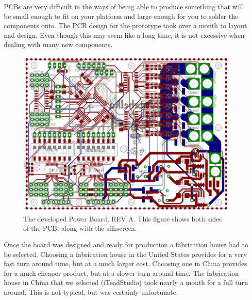 \documentclass{article}
\numberwithin{equation}{section} %
\begin{document}
PCBs are very difficult in the ways of being able to produce something that will be small enough to fit on your platform and large enough for you to solder the components onto. The PCB design for the prototype took over a month to layout and design. Even though this may seem like a long time, it is not excessive when dealing with many new components.
\begin{figure}[h!]
  \centering
	\includegraphics[scale=.23]{revA_both.png}
  \caption{The developed Power Board, REV A. This figure shows both sides of the PCB, along with the silkscreen.}
\end{figure}  
Once the board was designed and ready for production a fabrication house had to be selected. Choosing a fabrication house in the United States provides for a very fast turn around time, but at a much larger cost. Choosing one in China provides for a much cheaper product, but at a slower turn around time. The fabrication house in China that we selected (iTeadStudio) took nearly a month for a full turn around. This is not typical, but was certainly unfortunate.
\end{document}
